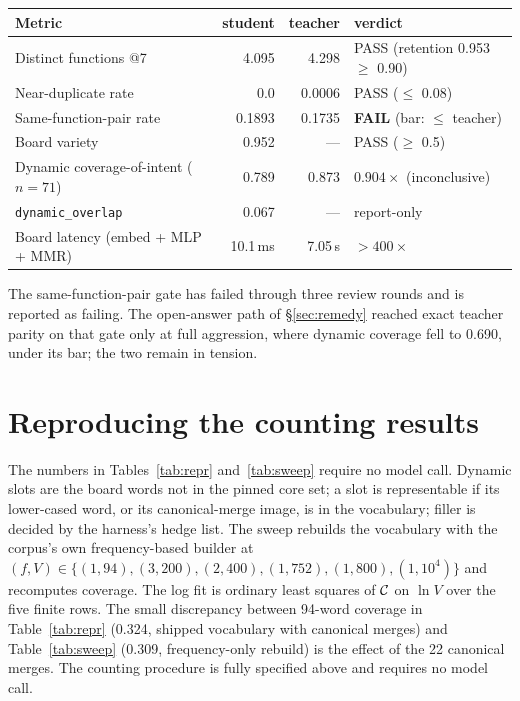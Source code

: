 \begin{center}
\small
\begin{tabular}{@{}lrrl@{}}
\toprule
Metric & student & teacher & verdict \\
\midrule
Distinct functions @7 & 4.095 & 4.298 & PASS (retention 0.953 $\ge$ 0.90) \\
Near-duplicate rate & 0.0 & 0.0006 & PASS ($\le$ 0.08) \\
Same-function-pair rate & 0.1893 & 0.1735 & \textbf{FAIL} (bar: $\le$ teacher) \\
Board variety & 0.952 & --- & PASS ($\ge$ 0.5) \\
Dynamic coverage-of-intent ($n=71$) & 0.789 & 0.873 & $0.904\times$ (inconclusive) \\
\texttt{dynamic\_overlap} & 0.067 & --- & report-only \\
Board latency (embed + MLP + MMR) & 10.1\,ms & 7.05\,s & ${>}400\times$ \\
\bottomrule
\end{tabular}
\end{center}
The same-function-pair gate has failed through three review rounds and is
reported as failing. The open-answer path of \S\ref{sec:remedy} reached exact
teacher parity on that gate only at full aggression, where dynamic
coverage fell to 0.690, under its bar; the two remain in tension.

\section{Reproducing the counting results}
\label{app:repro}
The numbers in Tables~\ref{tab:repr} and~\ref{tab:sweep} require no model
call. Dynamic slots are the board words not in the pinned core set; a slot is
representable if its lower-cased word, or its canonical-merge image, is in the
vocabulary; filler is decided by the harness's hedge list. The sweep rebuilds
the vocabulary with the corpus's own frequency-based builder at
$(f,V)\in\{(1,94),(3,200),(2,400),(1,752),(1,800),(1,10^4)\}$ and recomputes
coverage. The log fit is ordinary least squares of $\mathcal{C}$ on $\ln V$ over the
five finite rows. The small discrepancy between 94-word coverage in
Table~\ref{tab:repr} (0.324, shipped vocabulary with canonical merges) and
Table~\ref{tab:sweep} (0.309, frequency-only rebuild) is the effect of the 22
canonical merges. The counting procedure is fully specified above and requires no model call.


